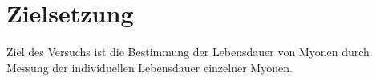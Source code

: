 \section{Zielsetzung}
\label{sec:zielsetzung}

Ziel des Versuchs ist die Bestimmung der Lebensdauer von Myonen durch Messung der individuellen Lebensdauer einzelner Myonen.
